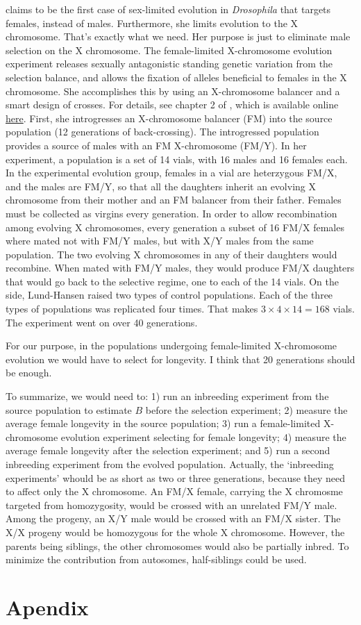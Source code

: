 \documentclass[a4paper,12pt]{article}
\begin{document}
\citet[p. 19]{Lund-Hansen2017} claims to be the first case of sex-limited evolution in \emph{Drosophila} that targets females, instead of males. Furthermore, she limits evolution to the X chromosome. That's exactly what we need. Her purpose is just to eliminate male selection on the X chromosome. The female-limited X-chromosome evolution experiment releases sexually antagonistic standing genetic variation from the selection balance, and allows the fixation of alleles beneficial to females in the X chromosome. She accomplishes this by using an X-chromosome balancer and a smart design of crosses. For details, see chapter 2 of \citet{Lund-Hansen2017}, which is available online \href{http://sro.sussex.ac.uk/70184/1/Lund-Hansen%2C%20Katrine%20Koch.pdf}{here}.
First, she introgresses an X-chromosome balancer (FM) into the source population (12 generations of back-crossing). The introgressed population provides a source of males with an FM X-chromosome (FM/Y). In her experiment, a population is a set of 14 vials, with 16 males and 16 females each. In the experimental evolution group, females in a vial are heterzygous FM/X, and the males are FM/Y, so that all the daughters inherit an evolving X chromosome from their mother and an FM balancer from their father. Females must be collected as virgins every generation. In order to allow recombination among evolving X chromosomes, every generation a subset of 16 FM/X females where mated not with FM/Y males, but with X/Y males from the same population. The two evolving X chromosomes in any of their daughters would recombine. When mated with FM/Y males, they would produce FM/X daughters that would go back to the selective regime, one to each of the 14 vials. On the side, Lund-Hansen raised two types of control populations. Each of the three types of populations was replicated four times. That makes $3\times 4 \times 14 = 168$ vials. The experiment went on over 40 generations.

For our purpose, in the populations undergoing female-limited X-chromosome evolution we would have to select for longevity. I think that 20 generations should be enough. 

To summarize, we would need to: 1) run an inbreeding experiment from the source population to estimate $B$ before the selection experiment; 2) measure the average female longevity in the source population; 3) run a female-limited X-chromosome evolution experiment selecting for female longevity; 4) measure the average female longevity after the selection experiment; and 5) run a second inbreeding experiment from the evolved population. Actually, the `inbreeding experiments' whould be as short as two or three generations, because they need to affect only the X chromosome. An FM/X female, carrying the X chromosme targeted from homozygosity, would be crossed with an unrelated FM/Y male. Among the progeny, an X/Y male would be crossed with an FM/X sister. The X/X progeny would be homozygous for the whole X chromosome. However, the parents being siblings, the other chromosomes would also be partially inbred. To minimize the contribution from autosomes, half-siblings could be used.


\section{Apendix}



\end{document}
